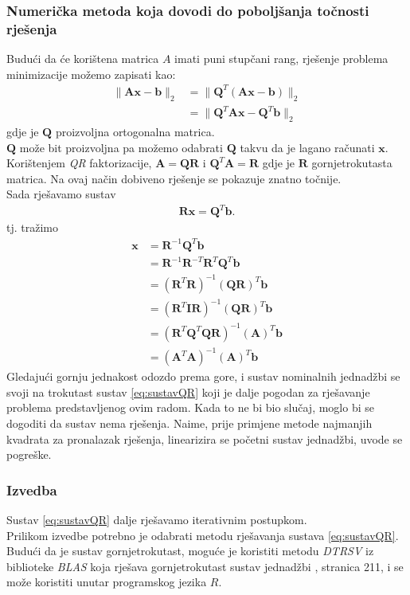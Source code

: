 \documentclass[a4paper,twoside,12pt]{memoir} %
\begin{document}
\subsubsection{Numerička metoda koja dovodi do poboljšanja točnosti rješenja}
Budući da će korištena matrica $A$ imati puni stupčani rang, rješenje problema minimizacije možemo zapisati kao:
\begin{align}
	\| \mathbf{A}\mathbf{x} - \mathbf{b} \|_2	
	& = \| \mathbf{Q}^T(\mathbf{A}\mathbf{x} - \mathbf{b}) \|_2 \\
	& = \| \mathbf{Q}^T \mathbf{A}\mathbf{x} - \mathbf{Q}^T \mathbf{b} \|_2	
\end{align}
gdje je $\mathbf{Q}$ proizvoljna ortogonalna matrica.\\
$\mathbf{Q}$ može bit proizvoljna pa možemo odabrati $\mathbf{Q}$ takvu da je lagano računati $\mathbf{x}$.
Korištenjem \textit{QR} faktorizacije, $\mathbf{A} = \mathbf{QR}$ i $\mathbf{Q}^T\mathbf{A} = \mathbf{R}$ gdje je $\mathbf{R}$ gornjetrokutasta matrica.
Na ovaj način dobiveno rješenje se pokazuje znatno točnije.\\
Sada rješavamo sustav
\begin{align}\label{eq:sustavQR}
	\mathbf{R}\mathbf{x} = \mathbf{Q}^T\mathbf{b}.
\end{align}
tj. tražimo  
\begin{align*}
\mathbf{x} & = \mathbf{R}^{-1}\mathbf{Q}^T\mathbf{b} \\
& = \mathbf{R}^{-1}\mathbf{R}^{-T}\mathbf{R}^{T}\mathbf{Q}^T\mathbf{b} \\
& = (\mathbf{R}^{T}\mathbf{R})^{-1}(\mathbf{QR})^{T}\mathbf{b} \\
& = (\mathbf{R}^{T} \mathbf{I} \mathbf{R})^{-1}(\mathbf{QR})^{T}\mathbf{b}  \\
& = (\mathbf{R}^{T} \mathbf{Q}^T\mathbf{Q} \mathbf{R})^{-1}(\mathbf{A})^{T}\mathbf{b} \\
& = (\mathbf{A}^{T}\mathbf{A})^{-1}(\mathbf{A})^{T}\mathbf{b}
\end{align*}
Gledajući gornju jednakost odozdo prema gore, i sustav nominalnih jednadžbi se svoji na trokutast sustav \ref{eq:sustavQR} koji je dalje pogodan za rješavanje problema predstavljenog ovim radom.
Kada to ne bi bio slučaj, moglo bi se dogoditi da sustav nema rješenja. Naime, prije primjene metode najmanjih kvadrata za pronalazak rješenja, linearizira se početni sustav jednadžbi, uvode se pogreške.

\subsubsection{Izvedba}
Sustav \ref{eq:sustavQR} dalje rješavamo iterativnim postupkom.\\
Prilikom izvedbe potrebno je odabrati metodu rješavanja sustava \ref{eq:sustavQR}.
Budući da je sustav gornjetrokutast, moguće je koristiti metodu \textit{DTRSV} iz biblioteke \textit{BLAS}
koja rješava gornjetrokutast sustav jednadžbi \cite{singerBook}, stranica 211, i se može koristiti unutar programskog jezika $R$.
\end{document}

